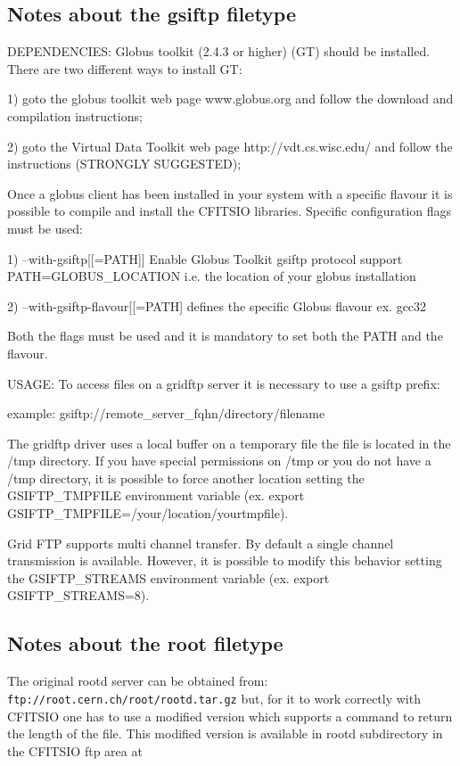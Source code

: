 \documentclass[11pt]{book}
\begin{document}
\subsection{Notes about the gsiftp filetype}

DEPENDENCIES: Globus toolkit (2.4.3 or higher) (GT) should be installed.
There are two different ways to install GT:

1) goto the globus toolkit web page www.globus.org and follow the
   download and compilation instructions;

2) goto the Virtual Data Toolkit web page http://vdt.cs.wisc.edu/
   and follow the instructions (STRONGLY SUGGESTED);

Once a globus client has been installed in your system with a specific flavour
it is possible to compile and install the CFITSIO libraries.
Specific configuration flags must be used:

1)  --with-gsiftp[[=PATH]] Enable Globus Toolkit gsiftp protocol support
    PATH=GLOBUS\_LOCATION i.e. the location of your globus installation

2)  --with-gsiftp-flavour[[=PATH] defines the specific Globus flavour
        ex. gcc32

Both the flags must be used and it is mandatory to set  both the PATH and the
flavour.

USAGE: To access files on a gridftp server it is necessary to use a gsiftp prefix:

example: gsiftp://remote\_server\_fqhn/directory/filename

The gridftp driver uses a local buffer on a temporary file the file is located
in the /tmp directory. If you have special permissions on /tmp or you do not have a /tmp
directory, it is possible to force another location setting the GSIFTP\_TMPFILE environment
variable (ex. export GSIFTP\_TMPFILE=/your/location/yourtmpfile).

Grid FTP supports multi channel transfer. By default a single channel transmission is
available. However, it is possible to modify this behavior setting the GSIFTP\_STREAMS
environment variable (ex. export GSIFTP\_STREAMS=8).


\subsection{Notes about the root filetype}

The original rootd server can be obtained from:
\verb-ftp://root.cern.ch/root/rootd.tar.gz-
but, for it to work correctly with CFITSIO one has to use a modified
version which supports a command to return the length of the file.
This modified version is available in rootd subdirectory
in the CFITSIO ftp area at
\end{document}
